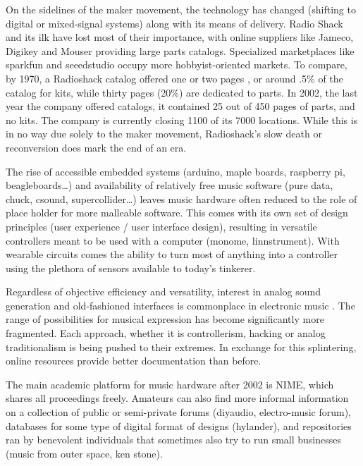 \begin{itemize}
On the sidelines of the maker movement, the technology has changed (shifting to digital or mixed-signal systems) along with its means of delivery. Radio Shack and its ilk have lost most of their importance, with online suppliers like Jameco, Digikey and Mouser providing large parts catalogs. Specialized marketplaces like sparkfun and seeedstudio occupy more hobbyist-oriented markets. To compare, by 1970, a Radioshack catalog offered one or two pages , or around .5\% of the catalog for kits, while thirty pages (20\%) are dedicated to parts. In 2002, the last year the company offered catalogs, it contained 25 out of 450 pages of parts, and no kits. The company is currently closing 1100 of its 7000 locations. While this is in no way due solely to the maker movement, Radioshack’s slow death or reconversion does mark the end of an era. 

The rise of accessible embedded systems (arduino, maple boards, raspberry pi, beagleboards…) and availability of relatively free music software (pure data, chuck, csound, supercollider…) leaves music hardware often reduced to the role of place holder for more malleable software. This comes with its own set of design principles (user experience / user interface design), resulting in versatile controllers meant to be used with a computer (monome, linnstrument). With wearable circuits comes the ability to turn most of anything into a controller using the plethora of sensors available to today’s tinkerer. 

Regardless of objective efficiency and versatility, interest in analog sound generation and old-fashioned interfaces is commonplace in electronic music \citep{collins2006}. The range of possibilities for musical expression has become significantly more fragmented. Each approach, whether it is controllerism, hacking or analog traditionalism is being pushed to their extremes. In exchange for this splintering, online resources provide better documentation than before.

The main academic platform for music hardware after 2002 is NIME, which shares all proceedings freely. Amateurs can also find more informal information on a collection of public or semi-private forums (diyaudio, electro-music forum), databases for some type of digital format of designs (hylander), and repositories ran by benevolent individuals that sometimes also try to run small businesses (music from outer space, ken stone).


\end{itemize}
